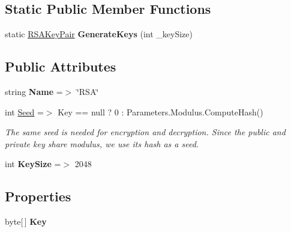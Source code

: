 \subsection*{Static Public Member Functions}
\begin{DoxyCompactItemize}
\item 
static \hyperlink{class_stegosaurus_1_1_cryptography_1_1_r_s_a_key_pair}{R\+S\+A\+Key\+Pair} {\bfseries Generate\+Keys} (int \+\_\+key\+Size)\hypertarget{class_stegosaurus_1_1_cryptography_1_1_r_s_a_provider_a23d4170a51bc7c17d8271a96c75b4e24}{}\label{class_stegosaurus_1_1_cryptography_1_1_r_s_a_provider_a23d4170a51bc7c17d8271a96c75b4e24}

\end{DoxyCompactItemize}
\subsection*{Public Attributes}
\begin{DoxyCompactItemize}
\item 
string {\bfseries Name} =$>$ \char`\"{}R\+SA\char`\"{}\hypertarget{class_stegosaurus_1_1_cryptography_1_1_r_s_a_provider_a68ff65d48e11ee45d1ef5bd48d6bfdb9}{}\label{class_stegosaurus_1_1_cryptography_1_1_r_s_a_provider_a68ff65d48e11ee45d1ef5bd48d6bfdb9}

\item 
int \hyperlink{class_stegosaurus_1_1_cryptography_1_1_r_s_a_provider_af73cf9dd65178ff5574b08072ea1a6c3}{Seed} =$>$ Key == null ? 0 \+: Parameters.\+Modulus.\+Compute\+Hash()
\begin{DoxyCompactList}\small\item\em The same seed is needed for encryption and decryption. Since the public and private key share modulus, we use its hash as a seed. \end{DoxyCompactList}\item 
int {\bfseries Key\+Size} =$>$ 2048\hypertarget{class_stegosaurus_1_1_cryptography_1_1_r_s_a_provider_a755fd6fc0a41a93c3a628df8e301b4ec}{}\label{class_stegosaurus_1_1_cryptography_1_1_r_s_a_provider_a755fd6fc0a41a93c3a628df8e301b4ec}

\end{DoxyCompactItemize}
\subsection*{Properties}
\begin{DoxyCompactItemize}
\item 
byte\mbox{[}$\,$\mbox{]} {\bfseries Key}\hypertarget{class_stegosaurus_1_1_cryptography_1_1_r_s_a_provider_aa2493d643bf46387cc97a30c14da887f}{}\label{class_stegosaurus_1_1_cryptography_1_1_r_s_a_provider_aa2493d643bf46387cc97a30c14da887f}

\end{DoxyCompactItemize}


